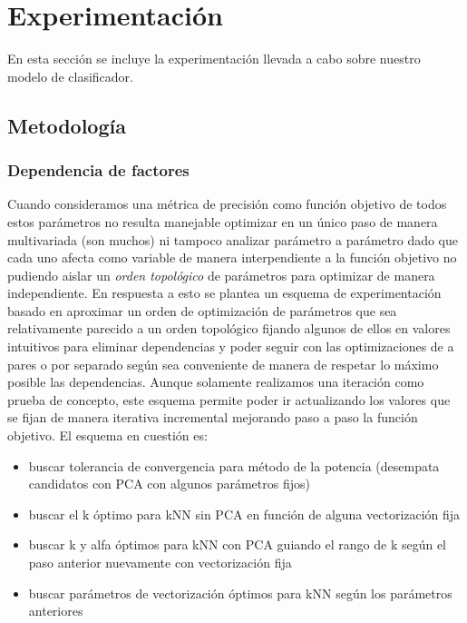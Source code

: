 \section{Experimentación}%
\label{sec:experimentacion}

En esta sección se incluye la experimentación llevada a cabo sobre nuestro
modelo de clasificador.
%

\subsection{Metodología}%
\label{sub:metodologia}
\subsubsection{Dependencia de factores}

Cuando consideramos una métrica de precisión como función objetivo de todos estos parámetros
no resulta manejable optimizar en un único paso de manera multivariada (son muchos)
ni tampoco analizar parámetro a parámetro dado que cada uno afecta como variable de manera
interpendiente a la función objetivo no pudiendo aislar un \textit{orden topológico}
de parámetros para optimizar de manera independiente.
En respuesta a esto se plantea un esquema de experimentación basado en aproximar
un orden de optimización de parámetros que sea relativamente parecido a un orden
topológico fijando algunos de ellos en valores intuitivos para eliminar dependencias
y poder seguir con las optimizaciones de a pares o por separado según sea conveniente
de manera de respetar lo máximo posible las dependencias.
Aunque solamente realizamos una iteración como prueba de concepto, este esquema
permite poder ir actualizando los valores que se fijan de manera iterativa incremental
mejorando paso a paso la función objetivo. El esquema en cuestión es:
\begin{itemize}
    \item buscar tolerancia de convergencia para método de la potencia (desempata candidatos con PCA con algunos parámetros fijos)
    \item buscar el k óptimo para kNN sin PCA en función de alguna vectorización fija
    \item buscar k y alfa óptimos para kNN con  PCA guiando el rango de k según el paso anterior nuevamente con vectorización fija
    \item buscar parámetros de vectorización óptimos para kNN según los parámetros anteriores
\end{itemize}


